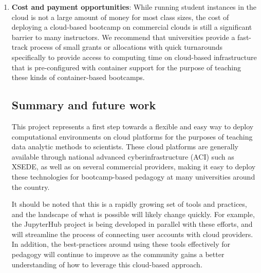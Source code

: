 \begin{enumerate}
\item {\bf Cost and payment opportunities}: While running student instances in the cloud
is not a large amount of money for most class sizes, the
cost of deploying a cloud-based bootcamp on commercial clouds is still a
significant barrier to many instructors. We recommend that universities provide
a fast-track process of small grants or allocations with quick turnarounds
specifically to provide access to computing time on cloud-based infrastructure
that is pre-configured with container support for the purpose of teaching
these kinds of container-based bootcamps.

\subsection{Summary and future work}

This project represents a first step towards a flexible and easy way to deploy
computational environments on cloud platforms for the purposes of teaching
data analytic methods to scientists. These cloud platforms are generally available
through national advanced cyberinfrastructure (ACI) such as XSEDE, as well as on several
commercial providers, making it easy to deploy these technologies for
bootcamp-based pedagogy at many universities around the country.

It should be noted that this is a rapidly growing set of tools and practices,
and the landscape of what is possible will likely change quickly. For example,
the JupyterHub project \cite{perez2015project} is being developed in parallel with
these efforts, and will streamline the process of connecting user
accounts with cloud providers. In addition, the best-practices around using
these tools effectively for pedagogy will continue to improve as the community
gains a better understanding of how to leverage this cloud-based approach.

\end{enumerate}
